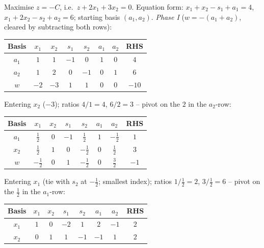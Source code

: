 \begin{solutions}
  \item Maximise $z=-C$, i.e.\ $z+2x_{1}+3x_{2}=0$. Equation form:
        $x_{1}+x_{2}-s_{1}+a_{1}=4$, $x_{1}+2x_{2}-s_{2}+a_{2}=6$;
        starting basis $(a_{1},a_{2})$. \emph{Phase I}
        ($w=-(a_{1}+a_{2})$, cleared by subtracting both rows):
        \begin{center}
        \begin{tabular}{c|cccccc|c}
        Basis & $x_{1}$ & $x_{2}$ & $s_{1}$ & $s_{2}$ & $a_{1}$ & $a_{2}$
              & RHS\\
        \hline
        $a_{1}$ & $1$ & $1$ & $-1$ & $0$ & $1$ & $0$ & $4$\\
        $a_{2}$ & $1$ & $2$ & $0$ & $-1$ & $0$ & $1$ & $6$\\
        \hline
        $w$ & $-2$ & $-3$ & $1$ & $1$ & $0$ & $0$ & $-10$\\
        \end{tabular}
        \end{center}
        Entering $x_{2}$ ($-3$); ratios $4/1=4$, $6/2=3$ -- pivot on the
        $2$ in the $a_{2}$-row:
        \begin{center}
        \begin{tabular}{c|cccccc|c}
        Basis & $x_{1}$ & $x_{2}$ & $s_{1}$ & $s_{2}$ & $a_{1}$ & $a_{2}$
              & RHS\\
        \hline
        $a_{1}$ & $\tfrac{1}{2}$ & $0$ & $-1$ & $\tfrac{1}{2}$ & $1$
                & $-\tfrac{1}{2}$ & $1$\\
        $x_{2}$ & $\tfrac{1}{2}$ & $1$ & $0$ & $-\tfrac{1}{2}$ & $0$
                & $\tfrac{1}{2}$ & $3$\\
        \hline
        $w$ & $-\tfrac{1}{2}$ & $0$ & $1$ & $-\tfrac{1}{2}$ & $0$
            & $\tfrac{3}{2}$ & $-1$\\
        \end{tabular}
        \end{center}
        Entering $x_{1}$ (tie with $s_{2}$ at $-\tfrac12$; smallest
        index); ratios $1/\tfrac12=2$, $3/\tfrac12=6$ -- pivot on the
        $\tfrac12$ in the $a_{1}$-row:
        \begin{center}
        \begin{tabular}{c|cccccc|c}
        Basis & $x_{1}$ & $x_{2}$ & $s_{1}$ & $s_{2}$ & $a_{1}$ & $a_{2}$
              & RHS\\
        \hline
        $x_{1}$ & $1$ & $0$ & $-2$ & $1$ & $2$ & $-1$ & $2$\\
        $x_{2}$ & $0$ & $1$ & $1$ & $-1$ & $-1$ & $1$ & $2$\\

\end{tabular}
\end{center}
\end{solutions}
